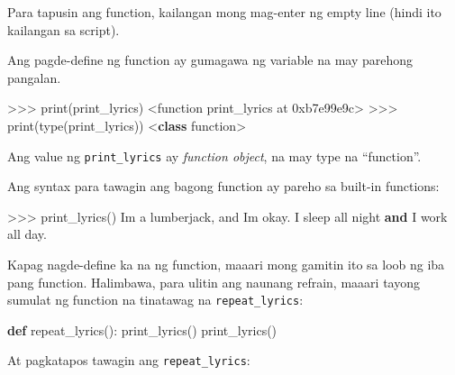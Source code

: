 \documentclass[10pt,]{book}
\newenvironment{Shaded}{}{}
\newcommand{\BaseNTok}[1]{\textcolor[rgb]{0.25,0.63,0.44}{#1}}
\newcommand{\BuiltInTok}[1]{\textcolor[rgb]{0.00,0.50,0.00}{#1}}
\newcommand{\KeywordTok}[1]{\textcolor[rgb]{0.00,0.44,0.13}{\textbf{#1}}}
\newcommand{\NormalTok}[1]{#1}
\newcommand{\OperatorTok}[1]{\textcolor[rgb]{0.40,0.40,0.40}{#1}}
\newcommand{\StringTok}[1]{\textcolor[rgb]{0.25,0.44,0.63}{#1}}
\begin{document}
Para tapusin ang function, kailangan mong mag-enter ng empty line (hindi
ito kailangan sa script).

Ang pagde-define ng function ay gumagawa ng variable na may parehong
pangalan.

\begin{Shaded}
\begin{Highlighting}[]
\OperatorTok{\textgreater{}\textgreater{}\textgreater{}} \BuiltInTok{print}\NormalTok{(print\_lyrics)}
\OperatorTok{\textless{}}\NormalTok{function print\_lyrics at }\BaseNTok{0xb7e99e9c}\OperatorTok{\textgreater{}}
\OperatorTok{\textgreater{}\textgreater{}\textgreater{}} \BuiltInTok{print}\NormalTok{(}\BuiltInTok{type}\NormalTok{(print\_lyrics))}
\OperatorTok{\textless{}}\KeywordTok{class} \StringTok{\textquotesingle{}function\textquotesingle{}}\OperatorTok{\textgreater{}}
\end{Highlighting}
\end{Shaded}

Ang value ng \texttt{print\_lyrics} ay \emph{function object}, na may
type na ``function''.

 

Ang syntax para tawagin ang bagong function ay pareho sa built-in
functions:

\begin{Shaded}
\begin{Highlighting}[]
\OperatorTok{\textgreater{}\textgreater{}\textgreater{}}\NormalTok{ print\_lyrics()}
\NormalTok{I}\StringTok{\textquotesingle{}m a lumberjack, and I\textquotesingle{}}\NormalTok{m okay.}
\NormalTok{I sleep }\BuiltInTok{all}\NormalTok{ night }\KeywordTok{and}\NormalTok{ I work }\BuiltInTok{all}\NormalTok{ day.}
\end{Highlighting}
\end{Shaded}

Kapag nagde-define ka na ng function, maaari mong gamitin ito sa loob ng
iba pang function. Halimbawa, para ulitin ang naunang refrain, maaari
tayong sumulat ng function na tinatawag na \texttt{repeat\_lyrics}:

\begin{Shaded}
\begin{Highlighting}[]
\KeywordTok{def}\NormalTok{ repeat\_lyrics():}
\NormalTok{    print\_lyrics()}
\NormalTok{    print\_lyrics()}
\end{Highlighting}
\end{Shaded}

At pagkatapos tawagin ang \texttt{repeat\_lyrics}:
\end{document}
